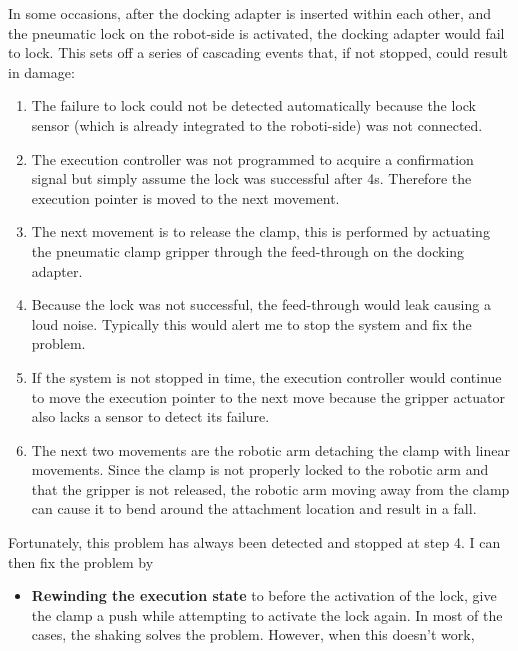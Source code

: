{In some occasions, after the docking adapter is inserted within each other, and the pneumatic lock on the robot-side is activated, the docking adapter would fail to lock. This sets off a series of cascading events that, if not stopped, could result in damage:

\begin{enumerate}
	\item The failure to lock could not be detected automatically because the lock sensor (which is already integrated to the roboti-side) was not connected.

	\item The execution controller was not programmed to acquire a confirmation signal but simply assume the lock was successful after 4s. Therefore the execution pointer is moved to the next movement.

	\item The next movement is to release the clamp, this is performed by actuating the pneumatic clamp gripper through the feed-through on the docking adapter.

	\item Because the lock was not successful, the feed-through would leak causing a loud noise. Typically this would alert me to stop the system and fix the problem.

	\item If the system is not stopped in time, the execution controller would continue to move the execution pointer to the next move because the gripper actuator also lacks a sensor to detect its failure.

	\item The next two movements are the robotic arm detaching the clamp with linear movements. Since the clamp is not properly locked to the robotic arm and that the gripper is not released, the robotic arm moving away from the clamp can cause it to bend around the attachment location and result in a fall. 

\end{enumerate}
Fortunately, this problem has always been detected and stopped at step 4. I can then fix the problem by 

\begin{itemize}
	\item \textbf{Rewinding the execution state }to before the activation of the lock, give the clamp a push while attempting to activate the lock again. In most of the cases, the shaking solves the problem. However, when this doesn’t work,


\end{itemize}}
